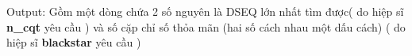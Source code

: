 Output:
Gồm một dòng chứa 2 số nguyên là DSEQ lớn nhất tìm được( do hiệp sĩ \textbf{ n\_cqt } yêu cầu ) và số cặp chỉ số thỏa mãn (hai số cách nhau một dấu cách) ( do hiệp sĩ \textbf{ blackstar } yêu cầu )
